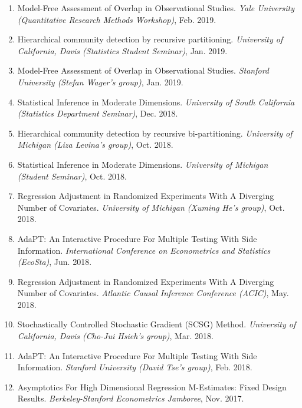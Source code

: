 \documentclass{article}
\begin{document}
\begin{enumerate}
\item Model-Free Assessment of Overlap in Observational Studies. \emph{Yale University (Quantitative Research Methods Workshop)}, Feb. 2019.
\item Hierarchical community detection by recursive partitioning. \emph{University of California, Davis (Statistics Student Seminar)}, Jan. 2019.
\item Model-Free Assessment of Overlap in Observational Studies. \emph{Stanford University (Stefan Wager's group)}, Jan. 2019.
\item Statistical Inference in Moderate Dimensions. \emph{University of South California (Statistics Department Seminar)}, Dec. 2018.
\item Hierarchical community detection by recursive bi-partitioning. \emph{University of Michigan (Liza Levina's group)}, Oct. 2018.
\item Statistical Inference in Moderate Dimensions. \emph{University of Michigan (Student Seminar)}, Oct. 2018.
\item Regression Adjustment in Randomized Experiments With A Diverging Number of Covariates. \emph{University of Michigan (Xuming He's group)}, Oct. 2018.
\item AdaPT: An Interactive Procedure For Multiple Testing With Side Information. \emph{International Conference on Econometrics and Statistics (EcoSta)}, Jun. 2018.
\item Regression Adjustment in Randomized Experiments With A Diverging Number of Covariates. \emph{Atlantic Causal Inference Conference (ACIC)}, May. 2018.
\item Stochastically Controlled Stochastic Gradient (SCSG) Method. \emph{University of California, Davis (Cho-Jui Hsieh's group)}, Mar. 2018.
\item AdaPT: An Interactive Procedure For Multiple Testing With Side Information. \emph{Stanford University (David Tse's group)}, Feb. 2018.
\item Asymptotics For High Dimensional Regression M-Estimates: Fixed Design Results. \emph{Berkeley-Stanford Econometrics Jamboree}, Nov. 2017. 
\end{enumerate}
 
\vspace{5mm}


\end{document}
